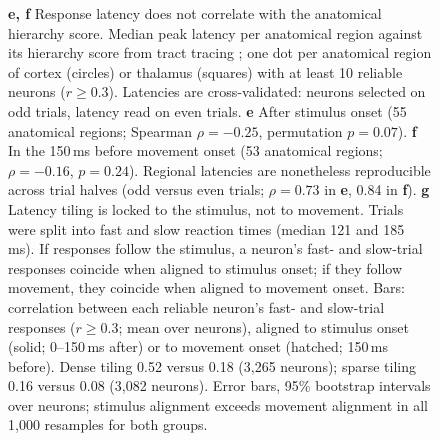\begin{figure}
{\textbf{e, f} Response latency does not correlate with the anatomical hierarchy score. Median peak latency per anatomical region against its hierarchy score from tract tracing \cite{harris2019hierarchical}; one dot per anatomical region of cortex (circles) or thalamus (squares) with at least 10 reliable neurons ($r\geq0.3$). Latencies are cross-validated: neurons selected on odd trials, latency read on even trials. \textbf{e} After stimulus onset (55 anatomical regions; Spearman $\rho=-0.25$, permutation $p=0.07$). \textbf{f} In the 150\,ms before movement onset (53 anatomical regions; $\rho=-0.16$, $p=0.24$). Regional latencies are nonetheless reproducible across trial halves (odd versus even trials; $\rho=0.73$ in \textbf{e}, 0.84 in \textbf{f}). \textbf{g} Latency tiling is locked to the stimulus, not to movement. Trials were split into fast and slow reaction times (median 121 and 185\,ms). If responses follow the stimulus, a neuron's fast- and slow-trial responses coincide when aligned to stimulus onset; if they follow movement, they coincide when aligned to movement onset. Bars: correlation between each reliable neuron's fast- and slow-trial responses ($r\geq0.3$; mean over neurons), aligned to stimulus onset (solid; 0--150\,ms after) or to movement onset (hatched; 150\,ms before). Dense tiling 0.52 versus 0.18 (3,265 neurons); sparse tiling 0.16 versus 0.08 (3,082 neurons). Error bars, 95\% bootstrap intervals over neurons; stimulus alignment exceeds movement alignment in all 1,000 resamples for both groups.}
\label{fig:latency_tiling_controls}
\end{figure}

\FloatBarrier

